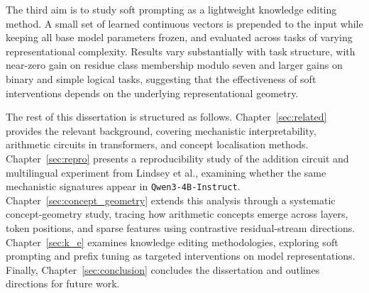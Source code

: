 The third aim is to study soft prompting as a lightweight knowledge editing method.
A small set of learned continuous vectors is prepended to the input while keeping
all base model parameters frozen, and evaluated across tasks of varying representational
complexity. Results vary substantially with task structure, with near-zero gain on
residue class membership modulo seven and larger gains on binary and simple logical tasks,
suggesting that the effectiveness of soft interventions depends on the underlying
representational geometry.

The rest of this dissertation is structured as follows. Chapter~\ref{sec:related} 
provides the relevant background, covering mechanistic interpretability, 
arithmetic circuits in transformers, and concept localisation methods. 
Chapter~\ref{sec:repro} presents a reproducibility study of the addition circuit 
and multilingual experiment from Lindsey et al., examining whether the same 
mechanistic signatures appear in \texttt{Qwen3-4B-Instruct}. 
Chapter~\ref{sec:concept_geometry} extends this analysis through a systematic
 concept-geometry study, tracing how arithmetic concepts emerge across layers,
  token positions, and sparse features using contrastive residual-stream directions. 
  Chapter~\ref{sec:k_e} examines knowledge editing methodologies, exploring soft 
  prompting and prefix tuning as targeted interventions on model representations. 
  Finally, Chapter~\ref{sec:conclusion} concludes the dissertation and outlines 
  directions for future work.